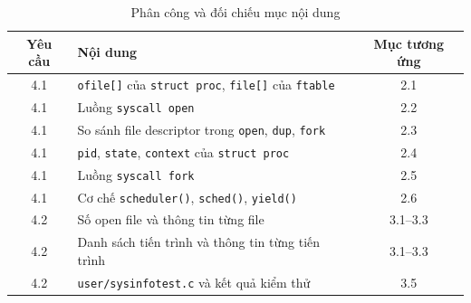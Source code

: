 \begin{table}[H]
\centering
\renewcommand{\arraystretch}{1.3}
\setlength{\tabcolsep}{8pt}
\begin{tabular}{|c|p{9.5cm}|c|}
\hline
\rowcolor[rgb]{0.8, 0.9, 1.0}
\textbf{Yêu cầu} & \textbf{Nội dung} & \textbf{Mục tương ứng} \\ \hline
4.1 & \texttt{ofile[]} của \texttt{struct proc}, \texttt{file[]} của \texttt{ftable} & 2.1 \\ \hline
4.1 & Luồng \texttt{syscall open} & 2.2 \\ \hline
4.1 & So sánh file descriptor trong \texttt{open}, \texttt{dup}, \texttt{fork} & 2.3 \\ \hline
4.1 & \texttt{pid}, \texttt{state}, \texttt{context} của \texttt{struct proc} & 2.4 \\ \hline
4.1 & Luồng \texttt{syscall fork} & 2.5 \\ \hline
4.1 & Cơ chế \texttt{scheduler()}, \texttt{sched()}, \texttt{yield()} & 2.6 \\ \hline
4.2 & Số open file và thông tin từng file & 3.1–3.3 \\ \hline
4.2 & Danh sách tiến trình và thông tin từng tiến trình & 3.1–3.3 \\ \hline
4.2 & \texttt{user/sysinfotest.c} và kết quả kiểm thử & 3.5 \\ \hline
\end{tabular}
\caption{Phân công và đối chiếu mục nội dung}
\end{table}